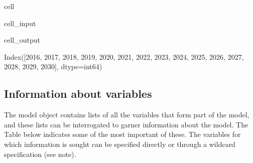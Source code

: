 \documentclass[letterpaper,10pt,english]{jupyterBook}
\begin{document}
\begin{sphinxuseclass}{cell}\begin{sphinxVerbatimInput}

\begin{sphinxuseclass}{cell_input}
\begin{sphinxVerbatim}[commandchars=\\\{\}]
\end{sphinxVerbatim}

\end{sphinxuseclass}\end{sphinxVerbatimInput}
\begin{sphinxVerbatimOutput}

\begin{sphinxuseclass}{cell_output}
\begin{sphinxVerbatim}[commandchars=\\\{\}]
Index([2016, 2017, 2018, 2019, 2020, 2021, 2022, 2023, 2024, 2025, 2026, 2027,
       2028, 2029, 2030],
      dtype=\PYGZsq{}int64\PYGZsq{})
\end{sphinxVerbatim}

\end{sphinxuseclass}\end{sphinxVerbatimOutput}

\end{sphinxuseclass}

\subsection{Information about variables}
\label{\detokenize{content/05_WBModels/LoadingWBModel:information-about-variables}}
\sphinxAtStartPar
The model object  contains lists of all the variables that form part of the model, and these lists can be interrogated to garner information about the model.  The Table below indicates some of the most important of these.  The variables for which information is sought can be specified directly or through a wildcard specification (see note).
\end{document}
